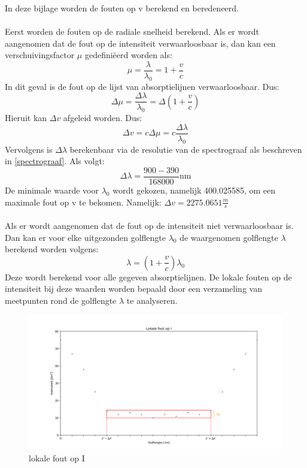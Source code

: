 \documentclass[12pt]{article}
\begin{document}
In deze bijlage worden de fouten op v berekend en beredeneerd.
\\\\
Eerst worden de fouten op de radiale snelheid berekend. Als er wordt aangenomen dat de fout op de intensiteit verwaarloosbaar is, dan kan een verschuivingsfactor $\mu$ gedefiniëerd worden als:
\begin{equation}
	\mu = \frac{\lambda}{\lambda_0} = 1 + \frac{v}{c}
\end{equation}
In dit geval is de fout op de lijst van absorptielijnen verwaarloosbaar. Dus:
\begin{equation}
	\Delta \mu = \frac{\Delta \lambda}{\lambda_0} = \Delta (1 + \frac{v}{c})
\end{equation}
Hieruit kan $\Delta v$ afgeleid worden. Dus:
\begin{equation}
	\Delta v = c \Delta \mu = c \frac{\Delta \lambda}{\lambda_0}
\end{equation}
Vervolgens is $\Delta \lambda$ berekenbaar via de resolutie van de spectrograaf als beschreven in \ref{spectrograaf}. Als volgt:
\begin{equation}
	\Delta \lambda = \frac{900 - 390}{168000} \text{nm}
\end{equation}
De minimale waarde voor $\lambda_0$ wordt gekozen, namelijk 400.025585, om een maximale fout op v te bekomen. Namelijk: $\Delta v = 2275.0651 \frac{m}{s}$
\\\\
Als er wordt aangenomen dat de fout op de intensiteit niet verwaarloosbaar is. Dan kan er voor elke uitgezonden golflengte $\lambda_0$ de waargenomen golflengte $\lambda$ berekend worden volgens:
\begin{equation}
	\lambda = (1 + \frac{v}{c})\lambda_0
\end{equation} 
Deze wordt berekend voor alle gegeven absorptielijnen. De lokale fouten op de intensiteit bij deze waarden worden bepaald door een verzameling van meetpunten rond de golflengte $\lambda$ te analyseren.
\begin{center}
	\begin{minipage}{1\textwidth}
		\begin{figure}[H]
			\centering
			\includegraphics[width=1\textwidth]{lokale_fout_op_I.png}
			\caption{\label{fig 6: lokale fout op I} lokale fout op I}
		\end{figure}
	\end{minipage}
\end{center}
\end{document}
